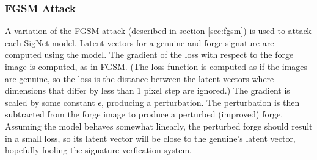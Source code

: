 





\subsubsection{FGSM Attack}\label{my_fgsm}
A variation of the FGSM attack (described in section \ref{sec:fgsm}) is used to attack each SigNet model.
Latent vectors for a genuine and forge signature are computed using the model.
The gradient of the loss with respect to the forge image is computed, as in FGSM.
(The loss function is computed as if the images are genuine, so the loss is the distance between the latent vectors where dimensions that differ by less than 1 pixel step are ignored.)
The gradient is scaled by some constant $\epsilon$, producing a perturbation.
The perturbation is then subtracted from the forge image to produce a perturbed (improved) forge.
Assuming the model behaves somewhat linearly, the perturbed forge should result in a small loss, so its latent vector will be close to the genuine's latent vector, hopefully fooling the signature verfication system.

